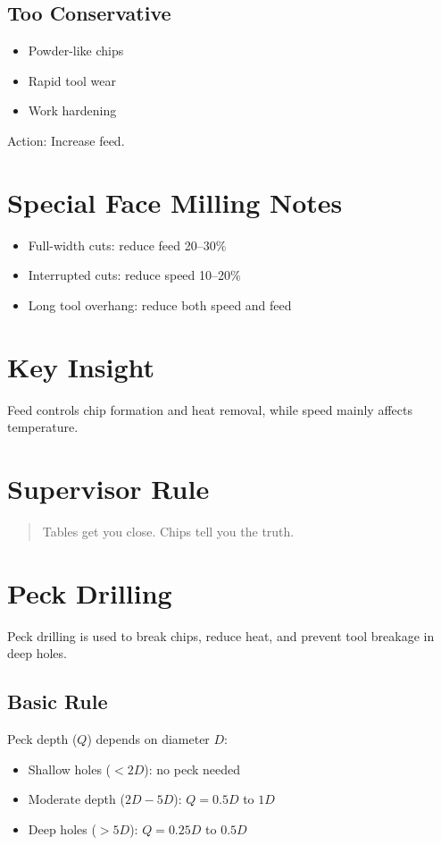 \documentclass{article}
\begin{document}
\subsection*{Too Conservative}
\begin{itemize}
\item Powder-like chips
\item Rapid tool wear
\item Work hardening
\end{itemize}
Action: Increase feed.

\section*{Special Face Milling Notes}
\begin{itemize}
\item Full-width cuts: reduce feed 20--30\%
\item Interrupted cuts: reduce speed 10--20\%
\item Long tool overhang: reduce both speed and feed
\end{itemize}

\section*{Key Insight}
Feed controls chip formation and heat removal, while speed mainly affects temperature.

\section*{Supervisor Rule}
\begin{quote}
Tables get you close. Chips tell you the truth.
\end{quote}



\section*{Peck Drilling}
Peck drilling is used to break chips, reduce heat, and prevent tool breakage in deep holes.

\subsection*{Basic Rule}
Peck depth ($Q$) depends on diameter $D$:
\begin{itemize}
\item Shallow holes ($< 2D$): no peck needed
\item Moderate depth ($2D-5D$): $Q = 0.5D$ to $1D$
\item Deep holes ($>5D$): $Q = 0.25D$ to $0.5D$
\end{itemize}
\end{document}
